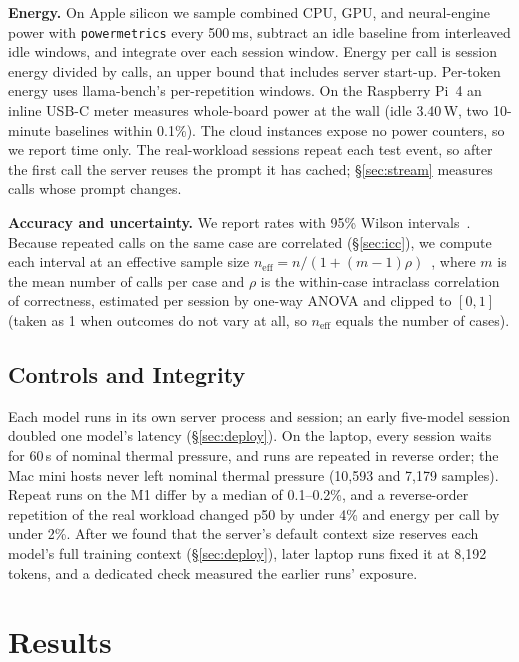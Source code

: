 \documentclass[conference]{IEEEtran}
\begin{document}
\textbf{Energy.} On Apple silicon we sample combined CPU, GPU, and neural-engine power with \texttt{powermetrics} every 500\,ms, subtract an idle baseline from interleaved idle windows, and integrate over each session window. Energy per call is session energy divided by calls, an upper bound that includes server start-up. Per-token energy uses llama-bench's per-repetition windows. On the Raspberry Pi~4 an inline USB-C meter measures whole-board power at the wall (idle 3.40\,W, two 10-minute baselines within 0.1\%). The cloud instances expose no power counters, so we report time only. The real-workload sessions repeat each test event, so after the first call the server reuses the prompt it has cached; \S\ref{sec:stream} measures calls whose prompt changes.

\textbf{Accuracy and uncertainty.} We report rates with 95\% Wilson intervals~\cite{wilson1927}. Because repeated calls on the same case are correlated (\S\ref{sec:icc}), we compute each interval at an effective sample size $n_{\mathrm{eff}} = n / (1 + (m-1)\rho)$~\cite{kish1965}, where $m$ is the mean number of calls per case and $\rho$ is the within-case intraclass correlation of correctness, estimated per session by one-way ANOVA and clipped to $[0,1]$ (taken as 1 when outcomes do not vary at all, so $n_{\mathrm{eff}}$ equals the number of cases).

\subsection{Controls and Integrity}

Each model runs in its own server process and session; an early five-model session doubled one model's latency (\S\ref{sec:deploy}). On the laptop, every session waits for 60\,s of nominal thermal pressure, and runs are repeated in reverse order; the Mac mini hosts never left nominal thermal pressure (10,593 and 7,179 samples). Repeat runs on the M1 differ by a median of 0.1--0.2\%, and a reverse-order repetition of the real workload changed p50 by under 4\% and energy per call by under 2\%. After we found that the server's default context size reserves each model's full training context (\S\ref{sec:deploy}), later laptop runs fixed it at 8,192 tokens, and a dedicated check measured the earlier runs' exposure.

\section{Results}
\end{document}
